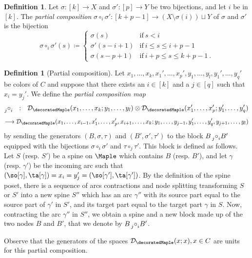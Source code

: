 \documentclass{amsart}
\theoremstyle{definition}
\newtheorem{definition}[theorem]{Definition}
\newcommand{\guillaume}[1]{\todo[color=orange!30]{#1 --- G.}}
\newcommand{\dioperad}{\mathcal{D}} %
\begin{document}
\begin{definition}
Let $\sigma : [k] \to X$ and $\sigma' : [p] \to Y$ be two bijections, and let $i$ be in $[k]$. 
The \emph{partial composition} $\sigma \circ_i \sigma' : [k+p-1] \to (X \setminus \sigma(i))\sqcup Y$ of $\sigma$ and $\sigma'$ is the bijection
\[
\sigma \circ_i \sigma' (s)\coloneqq \left\{
\begin{array}{cll}
  \sigma(s) & \text{if}\  s<i \\
  \sigma'(s-i+1) & \text{if}\ i\leq s \leq i+p-1 \\
  \sigma(s-p+1)  & \text{if}\ i+p\leq s \leq k+p-1 \ .
\end{array} 
\right. 
\]
\end{definition}

\begin{definition}[Partial composition]
Let $x_1,\ldots,x_k,x_1',\ldots,x_p',y_1,\ldots,y_l,y_1',\ldots,y_q'$ be colors of $C$ and suppose that there exists an $i \in [k]$ and a $j \in [q]$ such that $x_i=y_j'$. 
We define the \emph{partial composition map}
\[\prescript{}{j}{\circ}^{}_i \ \  : \ \  
\dioperad_{\decoratedMaple}(x_1,\ldots,x_k;y_1,\ldots,y_l) \otimes \dioperad_{\decoratedMaple}(x_1',\ldots,x_p';y_1',\ldots,y_q') \]
\[\longrightarrow \dioperad_{\decoratedMaple}(x_1,\ldots,x_{i-1},x_1',\ldots,x_p',x_{i+1},\ldots,x_k;y_1,\ldots,y_{j-1},y_1',\ldots,y_q',y_{j+1},\ldots,y_l)\]
by sending the generators $(B,\sigma, \tau)$ and $(B',\sigma',\tau')$ to the block $B \prescript{}{j}{\circ}^{}_i B'$ equipped with the bijections $\sigma \circ_i \sigma'$ and $\tau \circ_j \tau'$.
This block is defined as follows.  
Let $S$ (resp. $S'$) be a spine on $\Maple$ which contains $B$ (resp. $B'$), and let $\gamma$ (resp. $\gamma'$) be the incoming arc such that $(\so[\gamma],\ta[\gamma])=x_i=y_j'=(\so[\gamma'],\ta[\gamma'])$. 
By the definition of the spine poset, there is a sequence of arcs contractions and node splitting transforming $S$ or $S'$ into a new spine $S''$ which has an arc $\gamma''$ with its source part equal to the source part of $\gamma'$ in $S'$, and its target part equal to the target part $\gamma$ in $S$. 
Now, contracting the arc $\gamma''$ in $S''$, we obtain a spine and a new block made up of the two nodes $B$ and $B'$, that we denote by $B \prescript{}{j}{\circ}^{}_i B'$.
\guillaume{well-defined?}
\end{definition}

Observe that the generators of the spaces $\dioperad_{\decoratedMaple}(x;x), x \in C$ are units for this partial composition.
\end{document}
